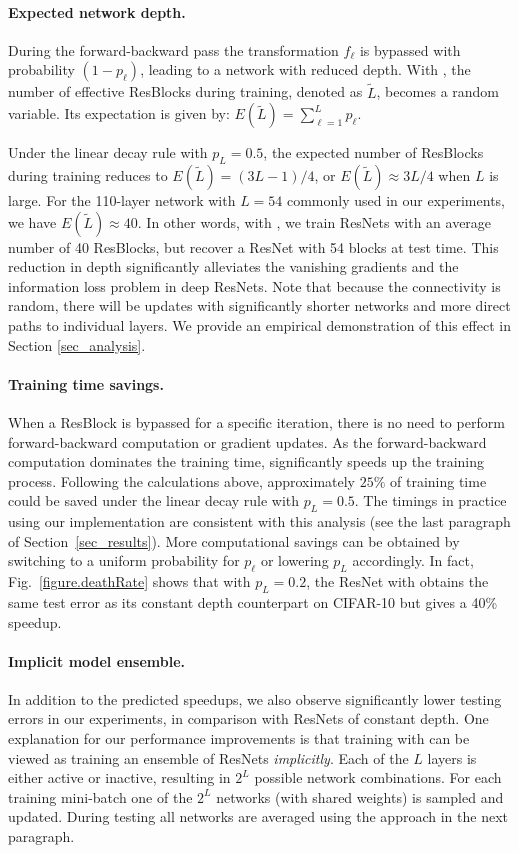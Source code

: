 \documentclass[runningheads]{llncs}
\begin{document}
\paragraph{\textbf{Expected network depth}.}
During the forward-backward pass the transformation $f_\ell$ is bypassed with probability $(\!1-p_\ell\!)$, leading to a network with reduced depth.
With \name{}, the number of effective ResBlocks during training, denoted as $\tilde{L}$, becomes a random variable. Its expectation is given by:
$
E(\tilde{L}) =  \sum\nolimits_{\ell=1}^L p_\ell.
$

Under the linear decay rule with $p_L=0.5$, the expected number of ResBlocks during training reduces to $E(\tilde{L})=(3L-1)/4$, or $E(\tilde{L})\approx 3L/4$ when $L$ is large. For the 110-layer network with $L=54$ commonly used in our experiments, we have $E(\tilde{L})\approx 40$. In other words, with \name{}, we train ResNets with an average number of 40 ResBlocks, but recover a ResNet with 54 blocks at test time.
This reduction in depth significantly alleviates the vanishing gradients and the information loss problem in deep ResNets. Note that because the connectivity is random, there will be updates with significantly shorter networks and more direct paths to individual layers. We provide an empirical demonstration of this effect in Section \ref{sec_analysis}.

\paragraph{\textbf{Training time savings}.}
When a ResBlock is bypassed for a specific iteration, there is no need to perform forward-backward computation or gradient updates. As the forward-backward computation dominates the training time, \name{} significantly speeds up the training process. Following the calculations above, approximately $25\%$ of training time could be saved under the linear decay rule with $p_L=0.5$. The timings in practice using our implementation are consistent with this analysis (see the last paragraph of Section~\ref{sec_results}). More computational savings can be obtained by switching to a uniform probability for $p_\ell$ or lowering $p_L$ accordingly. In fact, Fig.~\ref{figure.deathRate} shows that with $p_L=0.2$, the ResNet with \name{} obtains the same test error as its constant depth counterpart on CIFAR-10 but gives a 40\% speedup.

\paragraph{\textbf{Implicit model ensemble}.}
In addition to the predicted speedups, we also observe significantly lower testing errors in our experiments, in comparison with ResNets of constant depth.
One explanation for our performance improvements is that training with \name{} can be viewed as training an ensemble of ResNets \emph{implicitly}.
Each of the $L$ layers is either active or inactive, resulting in $2^L$ possible network combinations. For each training mini-batch one of the $2^L$ networks (with shared weights) is sampled and updated. During testing all networks are averaged using the approach in the next paragraph.
\end{document}
